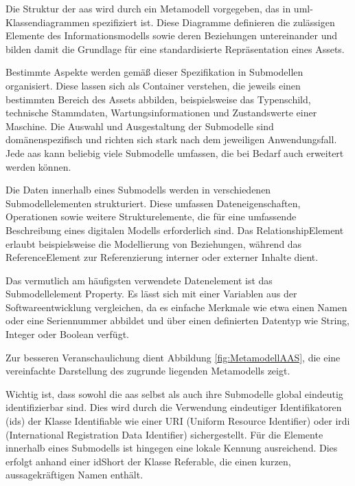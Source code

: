 Die Struktur der \acs{aas} wird durch ein Metamodell \cite{SpezifikationPart1} vorgegeben, das in \ac{uml}-Klassendiagrammen spezifiziert ist.
Diese Diagramme definieren die zulässigen Elemente des Informationsmodells sowie deren Beziehungen untereinander und bilden damit die Grundlage für eine standardisierte Repräsentation eines Assets.

Bestimmte Aspekte werden gemäß dieser Spezifikation in Submodellen organisiert.
Diese lassen sich als Container verstehen, die jeweils einen bestimmten Bereich des Assets abbilden, beispielsweise das Typenschild, technische Stammdaten, Wartungsinformationen und Zustandswerte einer Maschine.  
Die Auswahl und Ausgestaltung der Submodelle sind domänenspezifisch und richten sich stark nach dem jeweiligen Anwendungsfall.
Jede \acs{aas} kann beliebig viele Submodelle umfassen, die bei Bedarf auch erweitert werden können.

Die Daten innerhalb eines Submodells werden in verschiedenen Submodellelementen strukturiert.
Diese umfassen Dateneigenschaften, Operationen sowie weitere Strukturelemente, die für eine umfassende Beschreibung eines digitalen Modells erforderlich sind.
Das RelationshipElement erlaubt beispielsweise die Modellierung von Beziehungen, während das ReferenceElement zur Referenzierung interner oder externer Inhalte dient.

Das vermutlich am häufigsten verwendete Datenelement ist das Submodellelement 
\linebreak Property.
Es lässt sich mit einer Variablen aus der Softwareentwicklung vergleichen, da es einfache Merkmale wie etwa einen Namen oder eine Seriennummer abbildet und über einen definierten Datentyp wie String, Integer oder Boolean verfügt.

Zur besseren Veranschaulichung dient Abbildung \ref{fig:MetamodellAAS}, die eine vereinfachte Darstellung des zugrunde liegenden Metamodells zeigt.

Wichtig ist, dass sowohl die \acs{aas} selbst als auch ihre Submodelle global eindeutig identifizierbar sind.
Dies wird durch die Verwendung eindeutiger Identifikatoren (\acsp{id}) der Klasse Identifiable wie einer URI (Uniform Resource Identifier) oder \acs{irdi} (International Registration Data Identifier) sichergestellt.
Für die Elemente innerhalb eines Submodells ist hingegen eine lokale Kennung ausreichend. 
Dies erfolgt anhand einer idShort der Klasse Referable, die einen kurzen, aussagekräftigen Namen enthält.


